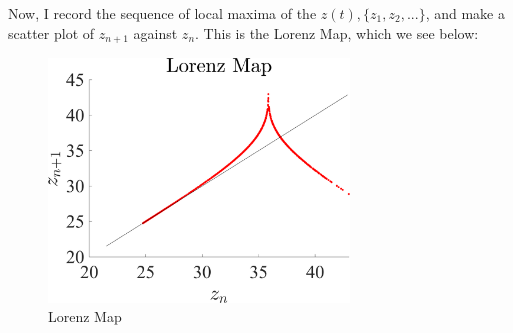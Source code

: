 \documentclass[11pt]{article}
\begin{document}
\clearpage

Now, I record the sequence of local maxima of the $z(t), \{z_1, z_2, ... \} $, and make a scatter plot of $z_{n+1}$ against $z_n$. This is the Lorenz Map, which we see below:
\begin{figure}[h]
\centering
\includegraphics[width=8cm]{Lorenz_Map.png}
\caption{Lorenz Map}
\end{figure}
\end{document}
